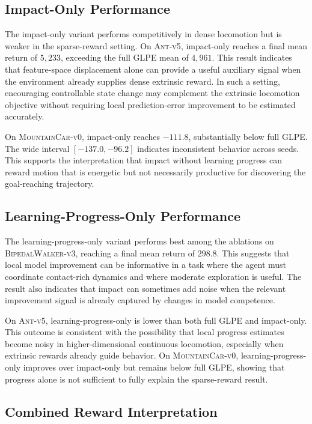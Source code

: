\subsection{Impact-Only Performance}
\label{subsec:results_impact_only}

The impact-only variant performs competitively in dense locomotion but is weaker in the sparse-reward setting.
On \textsc{Ant-v5}, impact-only reaches a final mean return of $5{,}233$, exceeding the full GLPE mean of $4{,}961$.
This result indicates that feature-space displacement alone can provide a useful auxiliary signal when the environment already supplies dense extrinsic reward.
In such a setting, encouraging controllable state change may complement the extrinsic locomotion objective without requiring local prediction-error improvement to be estimated accurately.

On \textsc{MountainCar-v0}, impact-only reaches $-111.8$, substantially below full GLPE.
The wide interval $[-137.0,-96.2]$ indicates inconsistent behavior across seeds.
This supports the interpretation that impact without learning progress can reward motion that is energetic but not necessarily productive for discovering the goal-reaching trajectory.

\subsection{Learning-Progress-Only Performance}
\label{subsec:results_learning_progress_only}

The learning-progress-only variant performs best among the ablations on \textsc{BipedalWalker-v3}, reaching a final mean return of $298.8$.
This suggests that local model improvement can be informative in a task where the agent must coordinate contact-rich dynamics and where moderate exploration is useful.
The result also indicates that impact can sometimes add noise when the relevant improvement signal is already captured by changes in model competence.

On \textsc{Ant-v5}, learning-progress-only is lower than both full GLPE and impact-only.
This outcome is consistent with the possibility that local progress estimates become noisy in higher-dimensional continuous locomotion, especially when extrinsic rewards already guide behavior.
On \textsc{MountainCar-v0}, learning-progress-only improves over impact-only but remains below full GLPE, showing that progress alone is not sufficient to fully explain the sparse-reward result.

\subsection{Combined Reward Interpretation}
\label{subsec:results_combined_reward}

